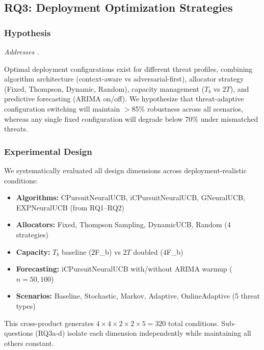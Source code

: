 \subsection{RQ3: Deployment Optimization Strategies}
\label{subsec:rq3_answer}

\subsubsection{Hypothesis}
\noindent\textit{Addresses .}

\noindent Optimal deployment configurations exist for different threat profiles, combining algorithm architecture (context-aware vs adversarial-first), allocator strategy (Fixed, Thompson, Dynamic, Random), capacity management ($T_b$ vs $2T$), and predictive forecasting (ARIMA on/off). We hypothesize that threat-adaptive configuration switching will maintain $>$85\% robustness across all scenarios, whereas any single fixed configuration will degrade below 70\% under mismatched threats.

\subsubsection{Experimental Design}

We systematically evaluated all design dimensions across deployment-realistic conditions:

\begin{itemize}
\item \textbf{Algorithms:} CPursuitNeuralUCB, iCPursuitNeuralUCB, GNeuralUCB, EXPNeuralUCB (from RQ1--RQ2)
\item \textbf{Allocators:} Fixed, Thompson Sampling, DynamicUCB, Random (4 strategies)
\item \textbf{Capacity:} $T_b$ baseline (2F_b) vs $2T$ doubled (4F_b)
\item \textbf{Forecasting:} iCPursuitNeuralUCB with/without ARIMA warmup ($n=50, 100$)
\item \textbf{Scenarios:} Baseline, Stochastic, Markov, Adaptive, OnlineAdaptive (5 threat types)
\end{itemize}

This cross-product generates $4 \times 4 \times 2 \times 2 \times 5 = 320$ total conditions. Sub-questions (RQ3a-d) isolate each dimension independently while maintaining all others constant.

